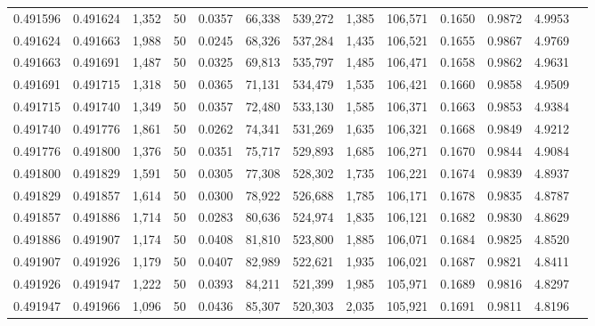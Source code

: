 \begin{tabular}{rrrrrrrrrrrrr}
0.491596 & 0.491624 & 1,352 &  50 &                                     0.0357 &  66,338 & 539,272 &   1,385 & 106,571 & 0.1650 & 0.9872 & 4.9953 \\
0.491624 & 0.491663 & 1,988 &  50 &                                     0.0245 &  68,326 & 537,284 &   1,435 & 106,521 & 0.1655 & 0.9867 & 4.9769 \\
0.491663 & 0.491691 & 1,487 &  50 &                                     0.0325 &  69,813 & 535,797 &   1,485 & 106,471 & 0.1658 & 0.9862 & 4.9631 \\
0.491691 & 0.491715 & 1,318 &  50 &                                     0.0365 &  71,131 & 534,479 &   1,535 & 106,421 & 0.1660 & 0.9858 & 4.9509 \\
0.491715 & 0.491740 & 1,349 &  50 &                                     0.0357 &  72,480 & 533,130 &   1,585 & 106,371 & 0.1663 & 0.9853 & 4.9384 \\
0.491740 & 0.491776 & 1,861 &  50 &                                     0.0262 &  74,341 & 531,269 &   1,635 & 106,321 & 0.1668 & 0.9849 & 4.9212 \\
0.491776 & 0.491800 & 1,376 &  50 &                                     0.0351 &  75,717 & 529,893 &   1,685 & 106,271 & 0.1670 & 0.9844 & 4.9084 \\
0.491800 & 0.491829 & 1,591 &  50 &                                     0.0305 &  77,308 & 528,302 &   1,735 & 106,221 & 0.1674 & 0.9839 & 4.8937 \\
0.491829 & 0.491857 & 1,614 &  50 &                                     0.0300 &  78,922 & 526,688 &   1,785 & 106,171 & 0.1678 & 0.9835 & 4.8787 \\
0.491857 & 0.491886 & 1,714 &  50 &                                     0.0283 &  80,636 & 524,974 &   1,835 & 106,121 & 0.1682 & 0.9830 & 4.8629 \\
0.491886 & 0.491907 & 1,174 &  50 &                                     0.0408 &  81,810 & 523,800 &   1,885 & 106,071 & 0.1684 & 0.9825 & 4.8520 \\
0.491907 & 0.491926 & 1,179 &  50 &                                     0.0407 &  82,989 & 522,621 &   1,935 & 106,021 & 0.1687 & 0.9821 & 4.8411 \\
0.491926 & 0.491947 & 1,222 &  50 &                                     0.0393 &  84,211 & 521,399 &   1,985 & 105,971 & 0.1689 & 0.9816 & 4.8297 \\
0.491947 & 0.491966 & 1,096 &  50 &                                     0.0436 &  85,307 & 520,303 &   2,035 & 105,921 & 0.1691 & 0.9811 & 4.8196 \\

\end{tabular}
